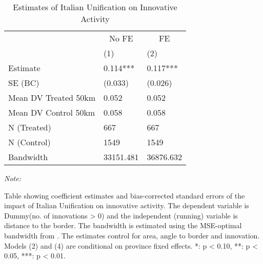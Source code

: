 \begin{table}[!h]

\caption{\label{tab:rd_analysis_dummy}Estimates of Italian Unification on Innovative Activity}
\centering
\fontsize{8}{10}\selectfont
\begin{threeparttable}
\begin{tabular}[t]{lll}
\toprule
\multicolumn{1}{c}{ } & \multicolumn{1}{c}{No FE} & \multicolumn{1}{c}{FE} \\
\cmidrule(l{3pt}r{3pt}){2-2} \cmidrule(l{3pt}r{3pt}){3-3}
  & (1) & (2)\\
\midrule
Estimate & 0.114*** & 0.117***\\
SE (BC) & (0.033) & (0.026)\\
Mean DV Treated 50km & 0.052 & 0.052\\
Mean DV Control 50km & 0.058 & 0.058\\
N (Treated) & 667 & 667\\
N (Control) & 1549 & 1549\\
Bandwidth & 33151.481 & 36876.632\\
\bottomrule
\end{tabular}
\begin{tablenotes}[para]
\item \textit{Note: } 
\item Table showing coefficient estimates and bias-corrected standard errors of the impact of Italian Unification on innovative activity. The dependent variable is Dummy(no. of innovations > 0) and the independent (running) variable is distance to the border. The bandwidth is estimated using the MSE-optimal bandwidth from \cite{cattaneo2019practical}. The estimates control for area, angle to border and innovation. Models (2) and (4) are conditional on province fixed effects. *: p < 0.10, **: p < 0.05, ***: p < 0.01.
\end{tablenotes}
\end{threeparttable}
\end{table}
